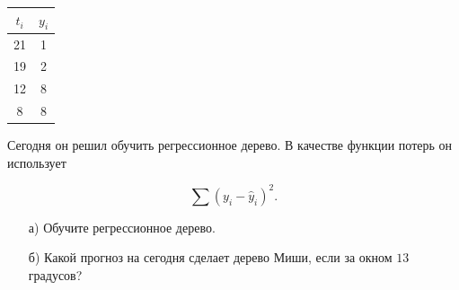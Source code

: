 \documentclass[12pt, a4paper, oneside]{article}
\begin{document}
\begin{center}
	\begin{tabular}{c|c}
		\hline
		$t_i$ & $y_i$ \\
		\hline
		21 &  1 \\
		19 & 2 \\
		12 & 8 \\
	     8 & 8 \\
	\end{tabular}
\end{center}

Сегодня он решил обучить регрессионное дерево. В качестве функции потерь он использует 

\[ \sum (y_i - \hat y_i)^2. \]

\begin{enumerate}
	\item[а)] Обучите регрессионное дерево.
	\item[б)] Какой прогноз на сегодня сделает дерево Миши, если за окном $13$ градусов? 
\end{enumerate}
\end{document}
